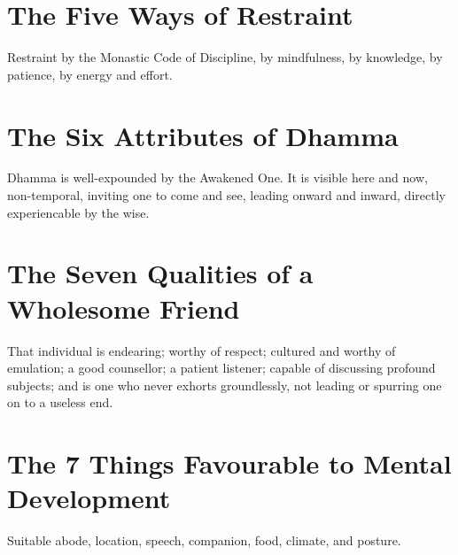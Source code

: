 
\section*{The Five Ways of Restraint}

Restraint by the Monastic Code of Discipline, by mindfulness, by knowledge, by
patience, by energy and effort.\\
\mbox{}

\vspace*{-\baselineskip}

\section*{The Six Attributes of Dhamma}

Dhamma is well-expounded by the Awakened One. It is visible here and now,
non-temporal, inviting one to come and see, leading onward and inward, directly
experiencable by the wise.\\
\mbox{}

\vspace*{-\baselineskip}

\section*{The Seven Qualities of a Wholesome Friend}


That individual is endearing; worthy of respect; cultured and worthy of
emulation; a good counsellor; a patient listener; capable of discussing profound
subjects; and is one who never exhorts groundlessly, not leading or spurring one
on to a useless end.\\
\mbox{}

\vspace*{-\baselineskip}

\section*{The 7 Things Favourable to Mental Development}


Suitable abode, location, speech, companion, food, climate, and posture.\\
\mbox{}

\clearpage

